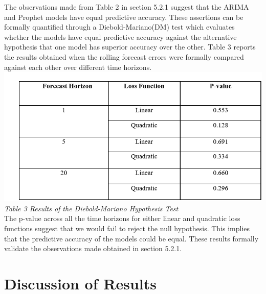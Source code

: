 \documentclass[12pt,a4paper]{article}
\numberwithin{equation}{section}
\numberwithin{figure}{section}
\numberwithin{table}{section}
\begin{document}
The observations made from Table 2 in section 5.2.1 suggest that the
ARIMA and Prophet models have equal predictive accuracy. These
assertions can be formally quantified through a Diebold-Mariano(DM) test
which evaluates whether the models have equal predictive accuracy
against the alternative hypothesis that one model has superior accuracy
over the other. Table 3 reports the results obtained when the rolling
forecast errors were formally compared against each other over different
time horizons.\\
\includegraphics[width=1.05000\textwidth]{dm results.png}\\
\emph{Table 3 Results of the Diebold-Mariano Hypothesis Test}\\
The p-value across all the time horizons for either linear and quadratic
loss functions suggest that we would fail to reject the null hypothesis.
This implies that the predictive accuracy of the models could be equal.
These results formally validate the observations made obtained in
section 5.2.1.

\section{Discussion of Results}\label{discussion-of-results}
\end{document}
